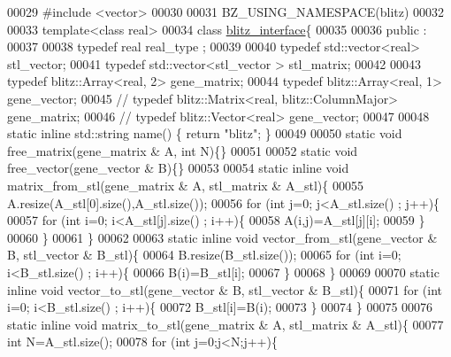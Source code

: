 \begin{DoxyCode}
00029 \textcolor{preprocessor}{#include <vector>}
00030 
00031 BZ\_USING\_NAMESPACE(blitz)
00032 
00033 \textcolor{keyword}{template}<\textcolor{keyword}{class} real>
00034 \textcolor{keyword}{class }\hyperlink{classblitz__interface}{blitz\_interface}\{
00035 
00036 public :
00037 
00038   \textcolor{keyword}{typedef} real real\_type ;
00039 
00040   \textcolor{keyword}{typedef} std::vector<real>  stl\_vector;
00041   \textcolor{keyword}{typedef} std::vector<stl\_vector > stl\_matrix;
00042 
00043   \textcolor{keyword}{typedef} blitz::Array<real, 2>  gene\_matrix;
00044   \textcolor{keyword}{typedef} blitz::Array<real, 1>  gene\_vector;
00045 \textcolor{comment}{//   typedef blitz::Matrix<real, blitz::ColumnMajor>  gene\_matrix;}
00046 \textcolor{comment}{//   typedef blitz::Vector<real> gene\_vector;}
00047 
00048   \textcolor{keyword}{static} \textcolor{keyword}{inline} std::string name() \{ \textcolor{keywordflow}{return} \textcolor{stringliteral}{"blitz"}; \}
00049 
00050   \textcolor{keyword}{static} \textcolor{keywordtype}{void} free\_matrix(gene\_matrix & A, \textcolor{keywordtype}{int} N)\{\}
00051 
00052   \textcolor{keyword}{static} \textcolor{keywordtype}{void} free\_vector(gene\_vector & B)\{\}
00053 
00054   \textcolor{keyword}{static} \textcolor{keyword}{inline} \textcolor{keywordtype}{void} matrix\_from\_stl(gene\_matrix & A, stl\_matrix & A\_stl)\{
00055     A.resize(A\_stl[0].size(),A\_stl.size());
00056     \textcolor{keywordflow}{for} (\textcolor{keywordtype}{int} j=0; j<A\_stl.size() ; j++)\{
00057       \textcolor{keywordflow}{for} (\textcolor{keywordtype}{int} i=0; i<A\_stl[j].size() ; i++)\{
00058         A(i,j)=A\_stl[j][i];
00059       \}
00060     \}
00061   \}
00062 
00063   \textcolor{keyword}{static} \textcolor{keyword}{inline} \textcolor{keywordtype}{void} vector\_from\_stl(gene\_vector & B, stl\_vector & B\_stl)\{
00064     B.resize(B\_stl.size());
00065     \textcolor{keywordflow}{for} (\textcolor{keywordtype}{int} i=0; i<B\_stl.size() ; i++)\{
00066       B(i)=B\_stl[i];
00067     \}
00068   \}
00069 
00070   \textcolor{keyword}{static} \textcolor{keyword}{inline} \textcolor{keywordtype}{void} vector\_to\_stl(gene\_vector & B, stl\_vector & B\_stl)\{
00071     \textcolor{keywordflow}{for} (\textcolor{keywordtype}{int} i=0; i<B\_stl.size() ; i++)\{
00072       B\_stl[i]=B(i);
00073     \}
00074   \}
00075 
00076   \textcolor{keyword}{static} \textcolor{keyword}{inline} \textcolor{keywordtype}{void} matrix\_to\_stl(gene\_matrix & A, stl\_matrix & A\_stl)\{
00077     \textcolor{keywordtype}{int} N=A\_stl.size();
00078     \textcolor{keywordflow}{for} (\textcolor{keywordtype}{int} j=0;j<N;j++)\{

\end{DoxyCode}
